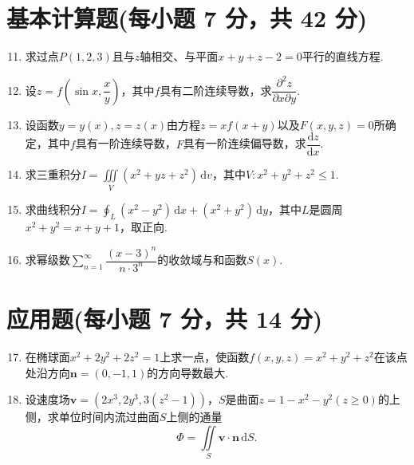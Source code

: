 \documentclass[../main.tex]{subfiles}
\begin{document}
\section{基本计算题(每小题 7 分，共 42 分)}
\begin{enumerate}
  \setcounter{enumi}{10}
  \item 求过点$P(1,2,3)$且与$z$轴相交、与平面$x+y+z-2=0$平行的直线方程.
        \vspace{10em}

  \item 设$z=f\left(\sin x,\dfrac{x}{y}\right)$，其中$f$具有二阶连续导数，求$\dfrac{\partial^{2}z}{\partial x\partial y}$.
        \vspace{10em}

  \item 设函数$y=y(x),z=z(x)$由方程$z=xf(x+y)$以及$F(x,y,z)=0$所确定，其中$f$具有一阶连续导数，$F$具有一阶连续偏导数，求$\dfrac{\mathrm{d}z}{\mathrm{d}x}$.
        \vspace{8em}

  \item 求三重积分$I=\iiint\limits_{V}(x^{2}+yz+z^{2})\,\mathrm{d}v$，其中$V:x^{2}+y^{2}+z^{2}\leq1$.
        \vspace{8em}

  \item 求曲线积分$I=\oint_{L}\left(x^{2}-y^{2}\right)\,\mathrm{d}x+\left(x^{2}+y^{2}\right)\,\mathrm{d}y$，其中$L$是圆周$x^{2}+y^{2}=x+y+1$，取正向.
        \vspace{8em}

  \item 求幂级数$\displaystyle\sum_{n=1}^{\infty}\dfrac{(x-3)^{n}}{n\cdot3^{n}}$的收敛域与和函数$S(x)$.
        \vspace{9em}
\end{enumerate}

\section{应用题(每小题 7 分，共 14 分)}
\begin{enumerate}
  \setcounter{enumi}{16}
  \item 在椭球面$x^{2}+2y^{2}+2z^{2}=1$上求一点，使函数$f(x,y,z)=x^{2}+y^{2}+z^{2}$在该点处沿方向$\boldsymbol{n}=(0,-1,1)$的方向导数最大.
        \vspace{9em}

  \item 设速度场$\boldsymbol{v}=\left(2x^{3},2y^{3},3(z^{2}-1)\right)$，$S$是曲面$z=1-x^{2}-y^{2}(z\geq0)$的上侧，求单位时间内流过曲面$S$上侧的通量
        \[
          \varPhi=\iint\limits_{S}\boldsymbol{v}\cdot\boldsymbol{n}\,\mathrm{d}S.
        \]
        \vspace{13em}
\end{enumerate}
\end{document}
